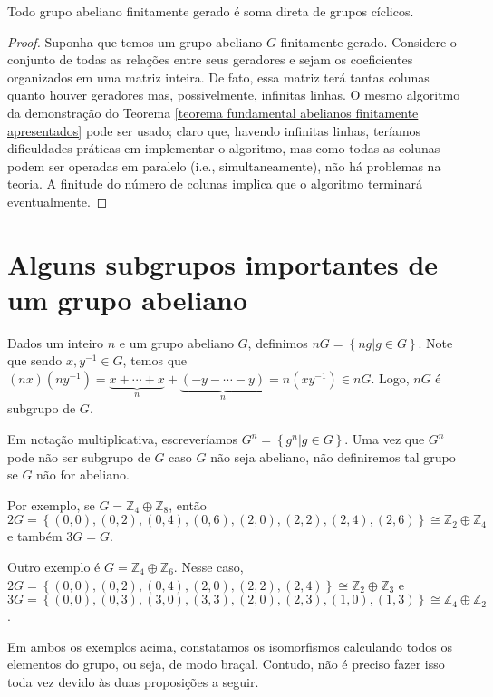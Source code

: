 	\begin{theorem}
		\label{teorema fundamental abelianos finitamente gerados}
		Todo grupo abeliano finitamente gerado é soma direta de grupos cíclicos.
	\end{theorem}
	\begin{proof}
		Suponha que temos um grupo abeliano $G$ finitamente gerado. Considere o conjunto de todas as relações entre seus geradores e sejam os coeficientes organizados em uma matriz inteira. De fato, essa matriz terá tantas colunas quanto houver geradores mas, possivelmente, infinitas linhas. O mesmo algoritmo da demonstração do Teorema \eqref{teorema fundamental abelianos finitamente apresentados} pode ser usado; claro que, havendo infinitas linhas, teríamos dificuldades práticas em implementar o algoritmo, mas como todas as colunas podem ser operadas em paralelo (i.e., simultaneamente), não há problemas na teoria. A finitude do número de colunas implica que o algoritmo terminará eventualmente.
	\end{proof}
	\section{Alguns subgrupos importantes de um grupo abeliano}
	\hspace{12pt} Dados um inteiro $n$ e um grupo abeliano $G$, definimos $nG = \left\{ ng\vert g\in G \right\}$. Note que sendo $x,y^{-1}\in G$, temos que $(nx)(ny^{-1}) = \underbrace{x+\cdots+x}_{n} + \underbrace{(-y-\cdots-y)}_{n} = n(xy^{-1})\in nG$. Logo, $nG$ é subgrupo de $G$. 
	\par\vspace{0.3cm} Em notação multiplicativa, escreveríamos $G^n = \left\{ g^n\vert g\in G \right\}$. Uma vez que $G^n$ pode não ser subgrupo de $G$ caso $G$ não seja abeliano, não definiremos tal grupo se $G$ não for abeliano.
	\par\vspace{0.3cm} Por exemplo, se $G = \mathbb{Z}_4\oplus\mathbb{Z}_8$, então $2G = \left\{ (0,0), (0,2), (0,4), (0,6), (2,0), (2,2), (2,4), (2, 6) \right\}\cong \mathbb{Z}_2\oplus\mathbb{Z}_4$ e também $3G=G$. 
	\par\vspace{0.3cm} Outro exemplo é $G = \mathbb{Z}_4\oplus\mathbb{Z}_6$. Nesse caso, $2G = \left\{ (0,0), (0,2), (0,4), (2,0), (2,2), (2,4) \right\}\cong \mathbb{Z}_2\oplus\mathbb{Z}_3$ e $3G = \left\{ (0,0), (0,3), (3,0), (3,3), (2,0), (2,3), (1,0), (1,3) \right\}\cong \mathbb{Z}_4\oplus\mathbb{Z}_2$. 
	\par\vspace{0.3cm} Em ambos os exemplos acima, constatamos os isomorfismos calculando todos os elementos do grupo, ou seja, de modo braçal. Contudo, não é preciso fazer isso toda vez devido às duas proposições a seguir.
	
